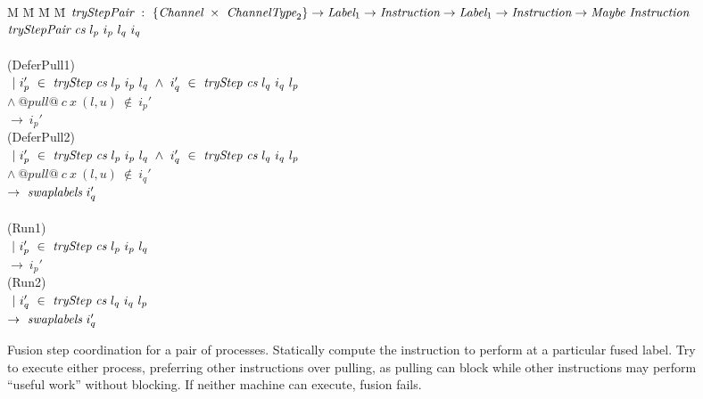 
\newcommand\nextStep[5]{\big((#1,~#2),~(#3,~#4),~#5 \big)}


\newcommand\note[1]{\textcolor{notec}{(#1)}}

\begin{figure}
\begin{tabbing}
M \= M \= M \= M \kill
$\textit{tryStepPair} ~:~ \{\textit{Channel} ~\times~ \textit{ChannelType}_2\} \to \textit{Label}_1 \to \textit{Instruction} \to \textit{Label}_1 \to \textit{Instruction} \to \textit{Maybe}~\textit{Instruction}$ \\
$\textit{tryStepPair} ~\textit{cs}~l_p~i_p~l_q~i_q$ \\
\\

\> \note{DeferPull1} \\
\> $~|~i_p'~\in~\textit{tryStep}~\textit{cs}~l_p~i_p~l_q ~\wedge~ i_q'~\in~\textit{tryStep}~\textit{cs}~l_q~i_q~l_p$ \\
\> $\wedge~@pull@~c~x~(l,u)~\not\in~i_p'$ \\
\> $\to~i_p'$ \\
\> \note{DeferPull2} \\
\> $~|~i_p'~\in~\textit{tryStep}~\textit{cs}~l_p~i_p~l_q ~\wedge~i_q'~\in~\textit{tryStep}~\textit{cs}~l_q~i_q~l_p$ \\
\> $\wedge~@pull@~c~x~(l,u)~\not\in~i_q'$ \\
\> $\to~\textit{swaplabels}~i_q'$ \\
\\

\> \note{Run1} \\
\> $~|~i_p'~\in~\textit{tryStep}~\textit{cs}~l_p~i_p~l_q$ \\
\> $\to~i_p'$ \\
\> \note{Run2} \\
\> $~|~i_q'~\in~\textit{tryStep}~\textit{cs}~l_q~i_q~l_p$ \\
\> $\to~\textit{swaplabels}~i_q'$ \\

\end{tabbing}
\caption{Fusion step coordination for a pair of processes.
Statically compute the instruction to perform at a particular fused label.
Try to execute either process, preferring other instructions over pulling, as pulling can block while other instructions may perform ``useful work'' without blocking.
If neither machine can execute, fusion fails.}
\label{fig:Fusion:Def:StepPair}
\end{figure}

